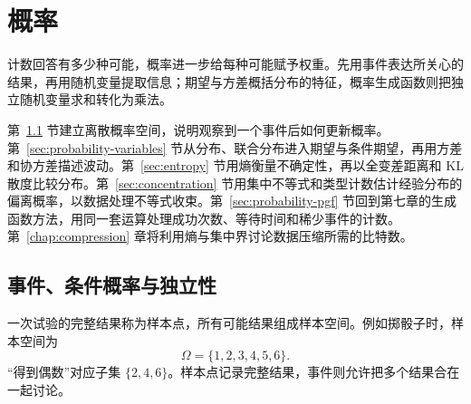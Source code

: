 \documentclass[lang=cn,a4paper,fontset=none,zihao=false,10pt,openany,twoside]{beautybook}
\numberwithin{algorithm}{chapter}
\begin{document}
\chapter{概率}\label{chap:probability}
\begin{wenxintishi}
计数回答有多少种可能，概率进一步给每种可能赋予权重。先用事件表达所关心的结果，再用随机变量提取信息；期望与方差概括分布的特征，概率生成函数则把独立随机变量求和转化为乘法。
\end{wenxintishi}
第~\ref{sec:probability-events} 节建立离散概率空间，说明观察到一个事件后如何更新概率。第~\ref{sec:probability-variables} 节从分布、联合分布进入期望与条件期望，再用方差和协方差描述波动。第~\ref{sec:entropy} 节用熵衡量不确定性，再以全变差距离和 KL 散度比较分布。第~\ref{sec:concentration} 节用集中不等式和类型计数估计经验分布的偏离概率，以数据处理不等式收束。第~\ref{sec:probability-pgf} 节回到第七章的生成函数方法，用同一套运算处理成功次数、等待时间和稀少事件的计数。第~\ref{chap:compression} 章将利用熵与集中界讨论数据压缩所需的比特数。
\begin{center}
\end{center}

\section{事件、条件概率与独立性}\label{sec:probability-events}
一次试验的完整结果称为样本点，所有可能结果组成样本空间。例如掷骰子时，样本空间为
\[\Omega=\{1,2,3,4,5,6\}.\]
“得到偶数”对应子集 $\{2,4,6\}$。样本点记录完整结果，事件则允许把多个结果合在一起讨论。
\end{document}
